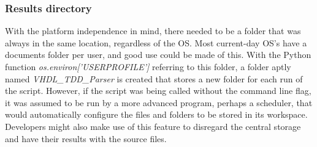 \documentclass[11pt,british]{article}
\begin{document}
\subsubsection{Results directory}
With the platform independence in mind, there needed to be a folder that was always in the same location, regardless of the \gls{OS}. Most current-day OS's have a documents folder per user, and good use could be made of this. With the Python function \emph{os.environ['USERPROFILE']} referring to this folder, a folder aptly named \emph{VHDL\_TDD\_Parser} is created that stores a new folder for each run of the script. However, if the script was being called without the command line flag, it was assumed to be run by a more advanced program, perhaps a scheduler, that would automatically configure the files and folders to be stored in its workspace. Developers might also make use of this feature to disregard the central storage and have their results with the source files.
\end{document}
